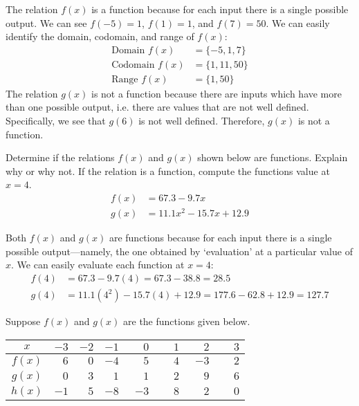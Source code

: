 \documentclass[11pt,letterpaper]{article}
\begin{document}
\sol The relation $f(x)$ is a function because for each input there is a single possible output. We can see $f(-5)= 1$, $f(1)= 1$, and $f(7)= 50$. We can easily identify the domain, codomain, and range of $f(x)$:
	\[
	\begin{aligned}
	\text{Domain } f(x)&= \{ -5, 1, 7 \} \\
	\text{Codomain } f(x)&= \{ 1, 11, 50 \} \\
	\text{Range } f(x)&= \{ 1, 50 \}
	\end{aligned}
	\]
The relation $g(x)$ is not a function because there are inputs which have more than one possible output, i.e. there are values that are not well defined. Specifically, we see that $g(6)$ is not well defined. Therefore, $g(x)$ is not a function. 



\newpage



 Determine if the relations $f(x)$ and $g(x)$ shown below are functions. Explain why or why not. If the relation is a function, compute the functions value at $x= 4$. 
	\[
	\begin{aligned}
	f(x)&= 67.3 - 9.7x \\[0.3cm]
	g(x)&= 11.1x^2 - 15.7x + 12.9
	\end{aligned}
	\] \pspace

\sol Both $f(x)$ and $g(x)$ are functions because for each input there is a single possible output---namely, the one obtained by `evaluation' at a particular value of $x$. We can easily evaluate each function at $x= 4$: \pspace
	\[
	\begin{aligned}
	f(4)&= 67.3 - 9.7(4)=  67.3 - 38.8= 28.5 \\[0.3cm]
	g(4)&= 11.1(4^2) - 15.7(4) + 12.9= 177.6 - 62.8 + 12.9= 127.7
	\end{aligned}
	\]



\newpage



 Suppose $f(x)$ and $g(x)$ are the functions given below. 
        \begin{table}[!ht]
        \centering
        \begin{tabular}{| c || r | r | r | r | r | r | r |} \hline
	$x$ & $-3$ & $-2$ & $-1$ & $\phantom{-}0$ & $\phantom{-}1$ & $\phantom{-}2$ & $\phantom{-}3$ \\ \hline
	$f(x)$ & $6$ & $0$ & $-4$ & $5$ & $4$ & $-3$ & $2$ \\ \hline
	$g(x)$ & $0$ & $3$ & $1$ & $1$ & $2$ & $9$ & $6$ \\ \hline
	$h(x)$ & $-1$ & $5$ & $-8$ & $-3$ & $8$ & $2$ & $0$ \\ \hline
        \end{tabular}
        \end{table}
\end{document}

